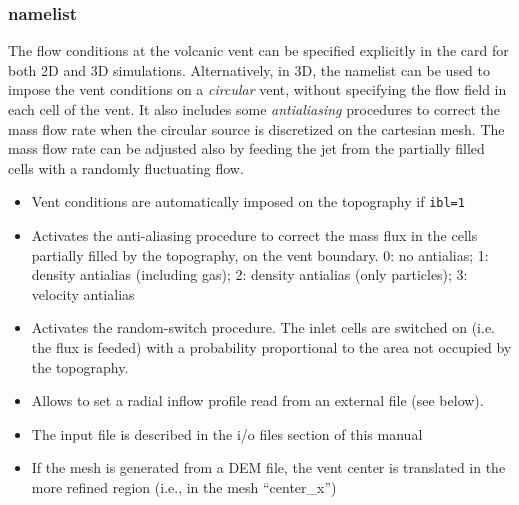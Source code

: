 \subsubsection{ namelist}
The flow conditions at the volcanic vent can be specified
explicitly in the  card for both 2D and 3D simulations.
Alternatively, in 3D, the  namelist can be used to impose the vent
conditions on a {\em circular} vent, without specifying the flow field in each 
cell of the vent. It also includes some {\em antialiasing} procedures to correct the mass flow rate
when the circular source is discretized on the cartesian mesh. The mass flow rate
can be adjusted also by feeding the jet from the partially filled cells with a randomly
fluctuating flow.

\begin{itemize}
\item
{}
{Vent conditions are automatically imposed on the topography if {\tt ibl=1}}

\item
{}
{Activates the anti-aliasing procedure to correct the mass flux in the cells
partially filled by the topography, on the vent boundary. 0: no antialias;
1: density antialias (including gas); 2: density antialias (only particles); 
3: velocity antialias}

\item
{}
{Activates the random-switch procedure. The inlet cells are switched on
(i.e. the flux is feeded) with a probability proportional to the area not 
occupied by the topography.}

\item
{}
{Allows to set a radial inflow profile read from an external file (see below).}

\item
{}
{The input file is described in the i/o files section of this manual}

\item
{}
{If the mesh is generated from a DEM file, the vent center is translated in the more refined region
(i.e., in the mesh ``center\_x'')}


\end{itemize}
